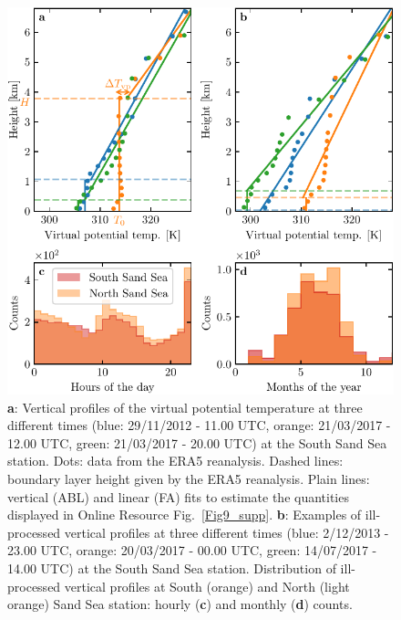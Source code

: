\begin{figure}[p]
\centering
\includegraphics[scale=1]{Figures/Figure8_supp.pdf}
\caption{\textbf{a}: Vertical profiles of the virtual potential temperature at three different times (blue: 29/11/2012 - 11.00 UTC, orange: 21/03/2017 - 12.00 UTC, green: 21/03/2017 - 20.00 UTC) at the South Sand Sea station. Dots: data from the ERA5 reanalysis. Dashed lines: boundary layer height given by the ERA5 reanalysis. Plain lines: vertical (ABL) and linear (FA) fits to estimate the quantities displayed in Online Resource Fig.~\ref{Fig9_supp}. \textbf{b}: Examples of ill-processed vertical profiles at three different times (blue: 2/12/2013 - 23.00 UTC, orange: 20/03/2017 - 00.00 UTC, green: 14/07/2017 - 14.00 UTC) at the South Sand Sea station. Distribution of ill-processed vertical profiles at South (orange) and North (light orange) Sand Sea station: hourly (\textbf{c}) and monthly (\textbf{d}) counts.}
\label{Fig8_supp}
\end{figure}

